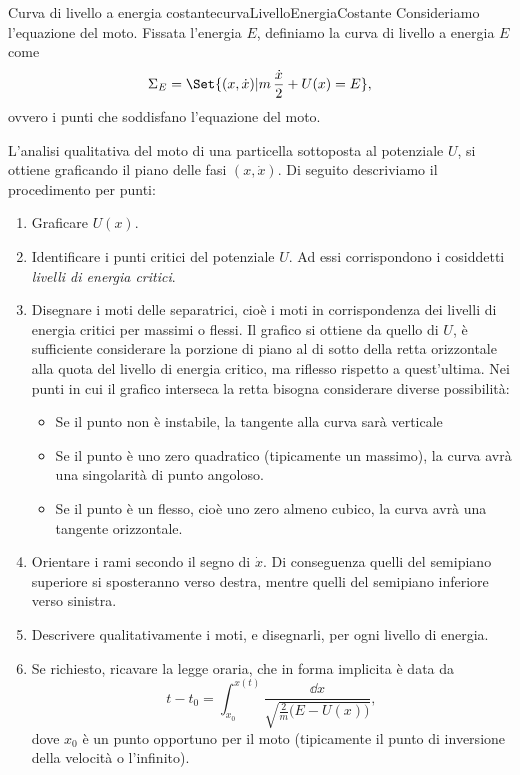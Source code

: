 \begin{defn}{Curva di livello a energia costante}{curvaLivelloEnergiaCostante}
	Consideriamo l'equazione del moto. Fissata l'energia \(E\), definiamo la curva di livello a energia \(E\) come
	\[
		\Sigma_E = \Set{(x,\dot{x}) | m\,\frac{\dot{x}}{2} + U(x) = E},
	\]
	ovvero i punti che soddisfano l'equazione del moto.
\end{defn}
\noindent
L'analisi qualitativa del moto di una particella sottoposta al potenziale \(U\), si ottiene graficando il piano delle fasi \((x,\dot{x})\). Di seguito descriviamo il procedimento per punti:
\begin{enumerate}
	\item Graficare \(U(x)\).
	\item Identificare i punti critici del potenziale \(U\).
	      Ad essi corrispondono i cosiddetti \emph{livelli di energia critici}.
	\item Disegnare i moti delle separatrici, cioè i moti in corrispondenza dei livelli di energia critici per massimi o flessi.
	      Il grafico si ottiene da quello di \(U\), è sufficiente considerare la porzione di piano al di sotto della retta orizzontale alla quota del livello di energia critico, ma riflesso rispetto a quest'ultima.
	      Nei punti in cui il grafico interseca la retta bisogna considerare diverse possibilità:
	      \begin{itemize}
		      \item Se il punto non è instabile, la tangente alla curva sarà verticale
		      \item Se il punto è uno zero quadratico (tipicamente un massimo), la curva avrà una singolarità di punto angoloso.
		      \item Se il punto è un flesso, cioè uno zero almeno cubico, la curva avrà una tangente orizzontale.
	      \end{itemize}
	\item Orientare i rami secondo il segno di \(\dot{x}\). Di conseguenza quelli del semipiano superiore si sposteranno verso destra, mentre quelli del semipiano inferiore verso sinistra.
	\item Descrivere qualitativamente i moti, e disegnarli, per ogni livello di energia.
	\item Se richiesto, ricavare la legge oraria, che in forma implicita è data da
	      \[
		      t-t_0 = \int_{x_0}^{x(t)} \frac{\dd x}{\sqrt{\frac{2}{m}\big(E-U(x)\big)}},
	      \]
	      dove \(x_0\) è un punto opportuno per il moto (tipicamente il punto di inversione della velocità o l'infinito).

\end{enumerate}
